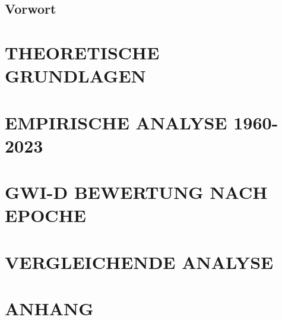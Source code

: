 \documentclass[11pt, a5paper, twoside, openright]{book}
\begin{document}
\chapter*{Vorwort}


\tableofcontents
\listoffigures
\listoftables

\mainmatter

\part{THEORETISCHE GRUNDLAGEN}




\part{EMPIRISCHE ANALYSE 1960-2023}





\part{GWI-D BEWERTUNG NACH EPOCHE}







\part{VERGLEICHENDE ANALYSE}




\part{ANHANG}
\appendix




\backmatter
\printglossary[title=Glossar]
\printglossary[type=acronym, title=Abkürzungen]
\end{document}
